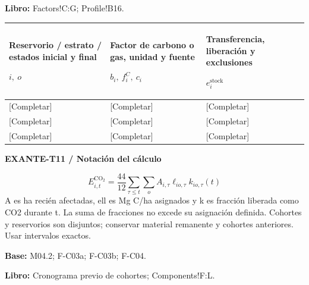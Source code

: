 \textbf{Libro:} Factors!C:G; Profile!B16.\par\endgroup
{\sffamily\fontsize{8.3}{10.3}\selectfont\begin{longtable}{@{}P{54.83mm} P{54.83mm} P{54.83mm}@{}}
\toprule
\textbf{Reservorio / estrato / estados inicial y final}\par {\normalfont\fontsize{8.2}{10}\selectfont $i,\ o$} & \textbf{Factor de carbono o gas, unidad y fuente}\par {\normalfont\fontsize{8.2}{10}\selectfont $b_i,\ f_i^C,\ c_i$} & \textbf{Transferencia, liberación y exclusiones}\par {\normalfont\fontsize{8.2}{10}\selectfont $e_i^{\mathrm{stock}}$}\\\midrule\endhead
\rule{0pt}{8mm}[Completar] & [Completar] & [Completar]\\\hline
\rule{0pt}{8mm}[Completar] & [Completar] & [Completar]\\\hline
\rule{0pt}{8mm}[Completar] & [Completar] & [Completar]\\\hline
\end{longtable}}
\par\begingroup\sffamily\fontsize{8}{10}\selectfont\color{NEBGreen}\setlength{\parskip}{2pt}\setlength{\abovedisplayskip}{4pt}\setlength{\belowdisplayskip}{4pt}\setlength{\abovedisplayshortskip}{2pt}\setlength{\belowdisplayshortskip}{3pt}
\textbf{EXANTE-T11 / Notación del cálculo}\par
{\fontsize{9}{11}\selectfont\[ E^{\mathrm{CO_2}}_{i,t}=\frac{44}{12}\sum_{\tau\le t}\sum_o A_{i,\tau}\ell_{io,\tau}k_{io,\tau}(t) \]}
A es ha recién afectadas, ell es Mg C/ha asignados y k es fracción liberada como CO2 durante t. La suma de fracciones no excede su asignación definida. Cohortes y reservorios son disjuntos; conservar material remanente y cohortes anteriores. Usar intervalos exactos.\par
\textbf{Base:} M04.2; F-C03a; F-C03b; F-C04.\par
\textbf{Libro:} Cronograma previo de cohortes; Components!F:L.\par\endgroup
